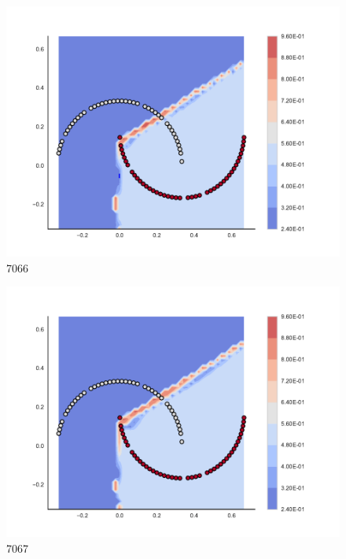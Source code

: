 \begin{subfigure}[b]{0.09\textwidth}
    \includegraphics[clip, trim=2.35cm 1.75cm 4.5cm 0cm,width=\textwidth]{img/convergence/7066.pdf}
    \caption{7066}
    \label{fig:convergence_7066}
\end{subfigure}
%
\begin{subfigure}[b]{0.09\textwidth}
    \includegraphics[clip, trim=2.35cm 1.75cm 4.5cm 0cm,width=\textwidth]{img/convergence/7067.pdf}
    \caption{7067}
    \label{fig:convergence_7067}
\end{subfigure}
%
